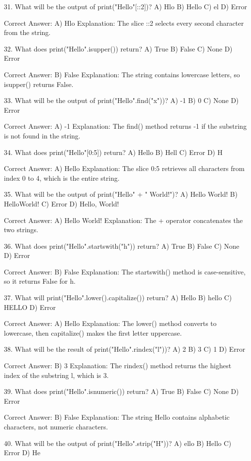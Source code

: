 31. What will be the output of print("Hello"[::2])?
A) Hlo
B) Hello
C) el
D) Error

Correct Answer: A) Hlo
Explanation: The slice ::2 selects every second character from the string.

32. What does print("Hello".isupper()) return?
A) True
B) False
C) None
D) Error

Correct Answer: B) False
Explanation: The string contains lowercase letters, so isupper() returns False.

33. What will be the output of print("Hello".find("x"))?
A) -1
B) 0
C) None
D) Error

Correct Answer: A) -1
Explanation: The find() method returns -1 if the substring is not found in the string.

34. What does print("Hello"[0:5]) return?
A) Hello
B) Hell
C) Error
D) H

Correct Answer: A) Hello
Explanation: The slice 0:5 retrieves all characters from index 0 to 4, which is the entire string.

35. What will be the output of print("Hello" + " World!")?
A) Hello World!
B) HelloWorld!
C) Error
D) Hello, World!

Correct Answer: A) Hello World!
Explanation: The + operator concatenates the two strings.

36. What does print("Hello".startswith("h")) return?
A) True
B) False
C) None
D) Error

Correct Answer: B) False
Explanation: The startswith() method is case-sensitive, so it returns False for h.

37. What will print("Hello".lower().capitalize()) return?
A) Hello
B) hello
C) HELLO
D) Error

Correct Answer: A) Hello
Explanation: The lower() method converts to lowercase, then capitalize() makes the first letter uppercase.

38. What will be the result of print("Hello".rindex("l"))?
A) 2
B) 3
C) 1
D) Error

Correct Answer: B) 3
Explanation: The rindex() method returns the highest index of the substring l, which is 3.

39. What does print("Hello".isnumeric()) return?
A) True
B) False
C) None
D) Error

Correct Answer: B) False
Explanation: The string Hello contains alphabetic characters, not numeric characters.

40. What will be the output of print("Hello".strip("H"))?
A) ello
B) Hello
C) Error
D) He

